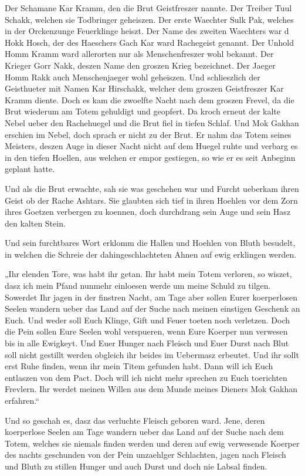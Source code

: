 \documentclass[a5paper,8pt]{book}
\begin{document}
Der Schamane Kar Kramm, den die Brut Geistfreszer nannte. Der Treiber Tuul Schakk, welchen sie Todbringer geheiszen. Der erste Waechter Sulk Pak, welches in der Orckenzunge Feuerklinge heiszt. Der Name des zweiten Waechters war d Hokk Hosch, der des Haeschers Gach Kar ward Rachegeist genannt. Der Unhold Homm Kramm ward allerorten nur als Menschenfreszer wohl bekannt. Der Krieger Gorr Nakk, deszen Name den groszen Krieg bezeichnet. Der Jaeger Homm Rakk auch Menschenjaeger wohl geheiszen. Und schlieszlich der Geisthueter mit Namen Kar Hirschakk, welcher dem groszen Geistfreszer Kar Kramm diente.
Doch es kam die zwoelfte Nacht nach dem groszen Frevel, da die Brut wiederum am Totem gehuldigt und geopfert. Da kroch erneut der kalte Nebel ueber den Rachehuegel und die Brut fiel in tiefen Schlaf. Und Mok Gakhan erschien im Nebel, doch sprach er nicht zu der Brut. Er nahm das Totem seines Meisters, deszen Auge in dieser Nacht nicht auf dem Huegel ruhte und verbarg es in den tiefen Hoellen, aus welchen er empor gestiegen, so wie er es seit Anbeginn geplant hatte.

Und als die Brut erwachte, sah sie was geschehen war und Furcht ueberkam ihren Geist ob der Rache Ashtars. Sie glaubten sich tief in ihren Hoehlen vor dem Zorn ihres Goetzen verbergen zu koennen, doch durchdrang sein Auge und sein Hasz den kalten Stein.

Und sein furchtbares Wort erklomm die Hallen und Hoehlen von Bluth besudelt, in welchen die Schreie der dahingeschlachteten Ahnen auf ewig erklingen werden. 

„Ihr elenden Tore, was habt ihr getan. Ihr habt mein Totem verloren, so wiszet, dasz ich mein Pfand nunmehr einloesen werde um meine Schuld zu tilgen. Sowerdet Ihr jagen in der finstren Nacht, am Tage aber sollen Eurer koerperlosen Seelen wandern ueber das Land auf der Suche nach meinen einstigen Geschenk an Euch. Und weder soll Euch Klinge, Gift und Feuer toeten noch verletzen. Doch die Pein sollen Eure Seelen wohl verspueren, wenn Eure Koerper nun verwesen bis in alle Ewigkeyt. Und Euer Hunger nach Fleisch und Euer Durst nach Blut soll nicht gestillt werden obgleich ihr beides im Uebermasz erbeutet. Und ihr sollt erst Ruhe finden, wenn ihr mein Titem gefunden habt. Dann will ich Euch entlaszen von dem Pact.
Doch will ich nicht mehr sprechen zu Euch toerichten Frevlern. Ihr werdet meinen Willen aus dem Munde meines Dieners Mok Gakhan erfahren.“

Und so geschah es, dasz das verluchte Fleisch geboren ward. Jene, deren koerperlose Seelen am Tage wandern ueber das Land auf der Suche nach dem Totem, welches sie niemals finden werden und deren auf ewig verwesende Koerper des nachts geschunden von der Pein unzaehlger Schlachten, jagen nach Fleisch und Bluth zu stillen Hunger und auch Durst und doch nie Labsal finden.
\end{document}
